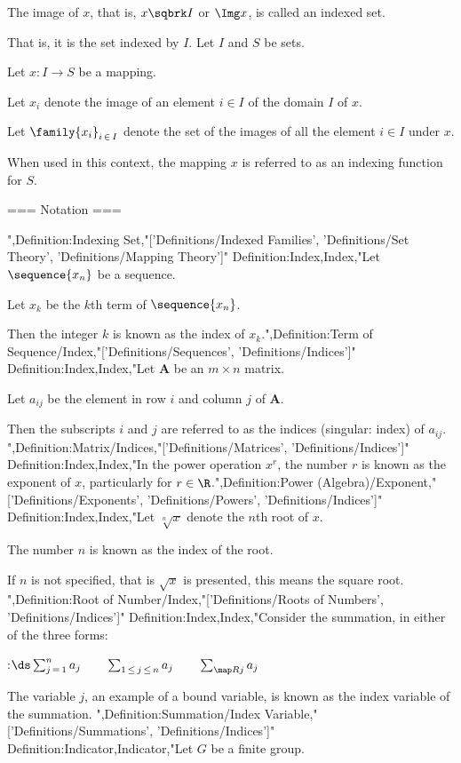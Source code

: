 The image of $x$, that is, $x \sqbrk I$ or $\Img x$, is called an indexed set.

That is, it is the set indexed by $I$.
Let $I$ and $S$ be sets.

Let $x: I \to S$ be a mapping.

Let $x_i$ denote the image of an element $i \in I$ of the domain $I$ of $x$.

Let $\family {x_i}_{i \mathop \in I}$ denote the set of the images of all the element $i \in I$ under $x$.


When used in this context, the mapping $x$ is referred to as an indexing function for $S$.


=== Notation ===

",Definition:Indexing Set,"['Definitions/Indexed Families', 'Definitions/Set Theory', 'Definitions/Mapping Theory']"
Definition:Index,Index,"Let $\sequence {x_n}$ be a sequence.

Let $x_k$ be the $k$th term of $\sequence {x_n}$.

Then the integer $k$ is known as the index of $x_k$.",Definition:Term of Sequence/Index,"['Definitions/Sequences', 'Definitions/Indices']"
Definition:Index,Index,"Let $\mathbf A$ be an $m \times n$ matrix.

Let $a_{i j}$ be the element in row $i$ and column $j$ of $\mathbf A$.


Then the subscripts $i$ and $j$ are referred to as the indices (singular: index) of $a_{i j}$.
",Definition:Matrix/Indices,"['Definitions/Matrices', 'Definitions/Indices']"
Definition:Index,Index,"In the power operation $x^r$, the number $r$ is known as the exponent of $x$, particularly for $r \in \R$.",Definition:Power (Algebra)/Exponent,"['Definitions/Exponents', 'Definitions/Powers', 'Definitions/Indices']"
Definition:Index,Index,"Let $\sqrt [n] x$ denote the $n$th root of $x$.

The number $n$ is known as the index of the root.


If $n$ is not specified, that is $\sqrt x$ is presented, this means the square root.
",Definition:Root of Number/Index,"['Definitions/Roots of Numbers', 'Definitions/Indices']"
Definition:Index,Index,"Consider the summation, in either of the three forms:

:$\ds \sum_{j \mathop = 1}^n a_j \qquad \sum_{1 \mathop \le j \mathop \le n} a_j \qquad \sum_{\map R j} a_j$


The variable $j$, an example of a bound variable, is known as the index variable of the summation.
",Definition:Summation/Index Variable,"['Definitions/Summations', 'Definitions/Indices']"
Definition:Indicator,Indicator,"Let $G$ be a finite group.

